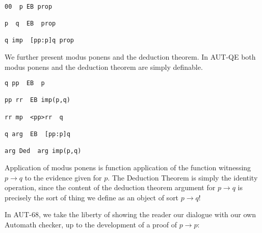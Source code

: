\documentclass{article}
\begin{document}
   \begin{verbatim}

00  p EB prop

p  q  EB  prop

q imp  [pp:p]q prop

\end{verbatim}



We further present modus ponens and the deduction theorem. In AUT-QE
both modus ponens and the deduction theorem are simply definable.

   \begin{verbatim}
q pp  EB  p

pp rr  EB imp(p,q)

rr mp  <pp>rr  q

q arg  EB  [pp:p]q

arg Ded  arg imp(p,q)
\end{verbatim}

Application of modus ponens is function application of the function witnessing $p \rightarrow q$ to the evidence given for $p$.  The Deduction Theorem is simply the identity operation, since the content of the deduction theorem argument for $p \rightarrow q$ is precisely the sort of thing we define as an object of sort $p \rightarrow q$!

In AUT-68, we take the liberty of showing the reader our dialogue with our own Automath checker, up to the development of a proof of $p\rightarrow p$:
\end{document}
